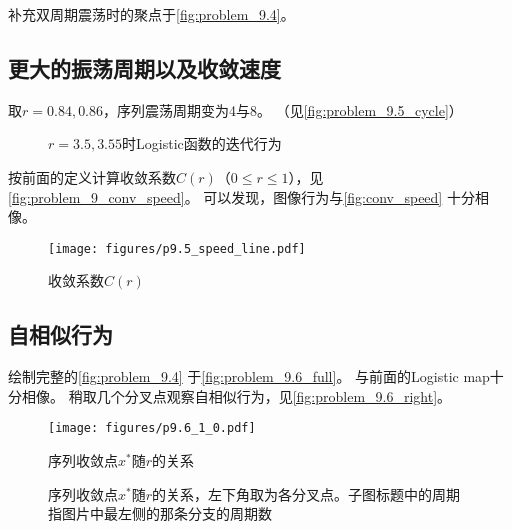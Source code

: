 补充双周期震荡时的聚点于\autoref{fig:problem_9.4}。

\subsection{更大的振荡周期以及收敛速度}
取$r=0.84, 0.86$，序列震荡周期变为4与8。
（见\autoref{fig:problem_9.5_cycle}）

\begin{figure}
    \centering
    \caption{$r=3.5, 3.55$时Logistic函数的迭代行为}
    \label{fig:problem_9.5_cycle}
\end{figure}

按前面的定义计算收敛系数$C(r)$（$0\le r\le 1$），见\autoref{fig:problem_9_conv_speed}。
可以发现，图像行为与\autoref{fig:conv_speed} 十分相像。

\begin{figure}
    \centering
    \texttt{[image: figures/p9.5\_speed\_line.pdf]}
    \caption{收敛系数$C(r)$}
    \label{fig:problem_9_conv_speed}
\end{figure}

\subsection{自相似行为}
绘制完整的\autoref{fig:problem_9.4} 于\autoref{fig:problem_9.6_full}。
与前面的Logistic map十分相像。
稍取几个分叉点观察自相似行为，见\autoref{fig:problem_9.6_right}。

\begin{figure}
    \centering
    \texttt{[image: figures/p9.6\_1\_0.pdf]}
    \caption{序列收敛点$x^*$随$r$的关系}
    \label{fig:problem_9.6_full}
\end{figure}

\begin{figure}
    \centering
    \caption{序列收敛点$x^*$随$r$的关系，左下角取为各分叉点。子图标题中的周期指图片中最左侧的那条分支的周期数}
    \label{fig:problem_9.6_right}
\end{figure}


